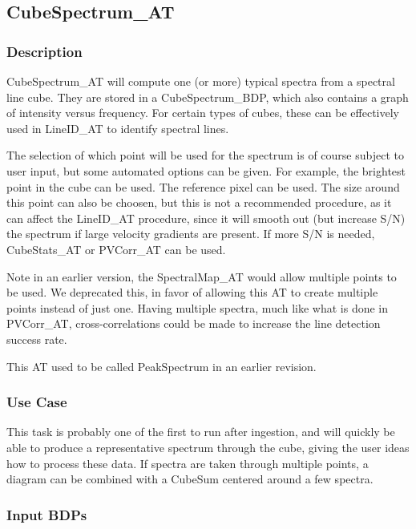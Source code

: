 
\subsection{CubeSpectrum\_AT}

\subsubsection{Description}

CubeSpectrum\_AT will compute one (or more) typical spectra
from a spectral line cube.
They are stored in a CubeSpectrum\_BDP, which also contains 
a graph of intensity versus frequency.
For certain types of cubes,
these can be effectively used in LineID\_AT to identify
spectral lines. 

The selection of which point will be used for the spectrum is of course
subject to user input, but some automated options can be given.
For example, the brightest point in the cube
can be used. The reference pixel can be used. The size around this point
can also be choosen, but this is not a recommended procedure, as it can
affect the LineID\_AT procedure, since it will smooth out (but increase S/N)
the spectrum if large velocity gradients are present. If more S/N is needed, 
CubeStats\_AT or PVCorr\_AT can be used.

Note in an earlier version, the SpectralMap\_AT would allow multiple
points to be used. We deprecated this, in favor of allowing this AT
to create multiple points instead of just one. Having multiple spectra,
much like what is done in PVCorr\_AT,  cross-correlations could be made
to increase the line detection success rate.

This AT used to be called PeakSpectrum in an earlier revision.

\subsubsection{Use Case}

This task is probably one of the first to run after ingestion, and will
quickly be able to produce a representative spectrum through the cube,
giving the user ideas how to process these data.  If spectra are taken 
through multiple points, a diagram can be combined with a CubeSum 
centered around a few spectra.


\subsubsection{Input BDPs}


